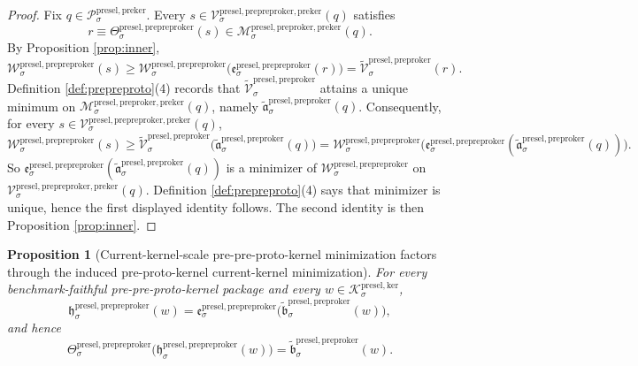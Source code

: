 \documentclass[11pt]{article}
\newcommand{\KernelBody}[1]{\mathcal K_{#1}^{\mathrm{presel,ker}}}
\newcommand{\PreKernelBody}[1]{\mathcal P_{#1}^{\mathrm{presel,preker}}}
\newcommand{\PreProtoKernelPreKernelFiber}[2]{\mathcal M_{#1}^{\mathrm{presel,preproker,preker}}(#2)}
\newcommand{\PrePreProtoKernelProj}[1]{\Theta_{#1}^{\mathrm{presel,prepreproker}}}
\newcommand{\PrePreProtoKernelFunctional}[1]{\mathscr W_{#1}^{\mathrm{presel,prepreproker}}}
\newcommand{\PrePreProtoKernelMinLift}[1]{\mathfrak e_{#1}^{\mathrm{presel,prepreproker}}}
\newcommand{\PrePreProtoKernelPreKernelFiber}[2]{\mathcal V_{#1}^{\mathrm{presel,prepreproker,preker}}(#2)}
\newcommand{\PrePreProtoKernelKernelMin}[1]{\mathfrak h_{#1}^{\mathrm{presel,prepreproker}}}
\newcommand{\InducedPreProtoKernelFunctional}[1]{\widetilde{\mathscr V}_{#1}^{\mathrm{presel,preproker}}}
\newcommand{\InducedPreProtoKernelPreKernelMin}[1]{\widetilde{\mathfrak a}_{#1}^{\mathrm{presel,preproker}}}
\newcommand{\InducedPreProtoKernelKernelMin}[1]{\widetilde{\mathfrak b}_{#1}^{\mathrm{presel,preproker}}}
\newtheorem{proposition}{Proposition}
\begin{document}
\begin{proof}
Fix \(q\in\PreKernelBody{\sigma}\). Every \(s\in\PrePreProtoKernelPreKernelFiber{\sigma}{q}\) satisfies
\[
r\equiv\PrePreProtoKernelProj{\sigma}(s)\in\PreProtoKernelPreKernelFiber{\sigma}{q}.
\]
By Proposition \ref{prop:inner},
\[
\PrePreProtoKernelFunctional{\sigma}(s)
\geq
\PrePreProtoKernelFunctional{\sigma}\bigl(\PrePreProtoKernelMinLift{\sigma}(r)\bigr)
=
\InducedPreProtoKernelFunctional{\sigma}(r).
\]
Definition \ref{def:prepreproto}(4) records that \(\InducedPreProtoKernelFunctional{\sigma}\) attains a unique minimum on \(\PreProtoKernelPreKernelFiber{\sigma}{q}\), namely \(\InducedPreProtoKernelPreKernelMin{\sigma}(q)\). Consequently, for every \(s\in\PrePreProtoKernelPreKernelFiber{\sigma}{q}\),
\[
\PrePreProtoKernelFunctional{\sigma}(s)
\geq
\InducedPreProtoKernelFunctional{\sigma}\bigl(\InducedPreProtoKernelPreKernelMin{\sigma}(q)\bigr)
=
\PrePreProtoKernelFunctional{\sigma}\bigl(\PrePreProtoKernelMinLift{\sigma}(\InducedPreProtoKernelPreKernelMin{\sigma}(q))\bigr).
\]
So \(\PrePreProtoKernelMinLift{\sigma}(\InducedPreProtoKernelPreKernelMin{\sigma}(q))\) is a minimizer of \(\PrePreProtoKernelFunctional{\sigma}\) on \(\PrePreProtoKernelPreKernelFiber{\sigma}{q}\). Definition \ref{def:prepreproto}(4) says that minimizer is unique, hence the first displayed identity follows. The second identity is then Proposition \ref{prop:inner}.
\end{proof}

\begin{proposition}[Current-kernel-scale pre-pre-proto-kernel minimization factors through the induced pre-proto-kernel current-kernel minimization]
\label{prop:kernelfactor}
For every benchmark-faithful pre-pre-proto-kernel package and every \(w\in\KernelBody{\sigma}\),
\[
\PrePreProtoKernelKernelMin{\sigma}(w)
=
\PrePreProtoKernelMinLift{\sigma}\bigl(\InducedPreProtoKernelKernelMin{\sigma}(w)\bigr),
\]
and hence
\[
\PrePreProtoKernelProj{\sigma}\bigl(\PrePreProtoKernelKernelMin{\sigma}(w)\bigr)
=
\InducedPreProtoKernelKernelMin{\sigma}(w).
\]
\end{proposition}
\end{document}
